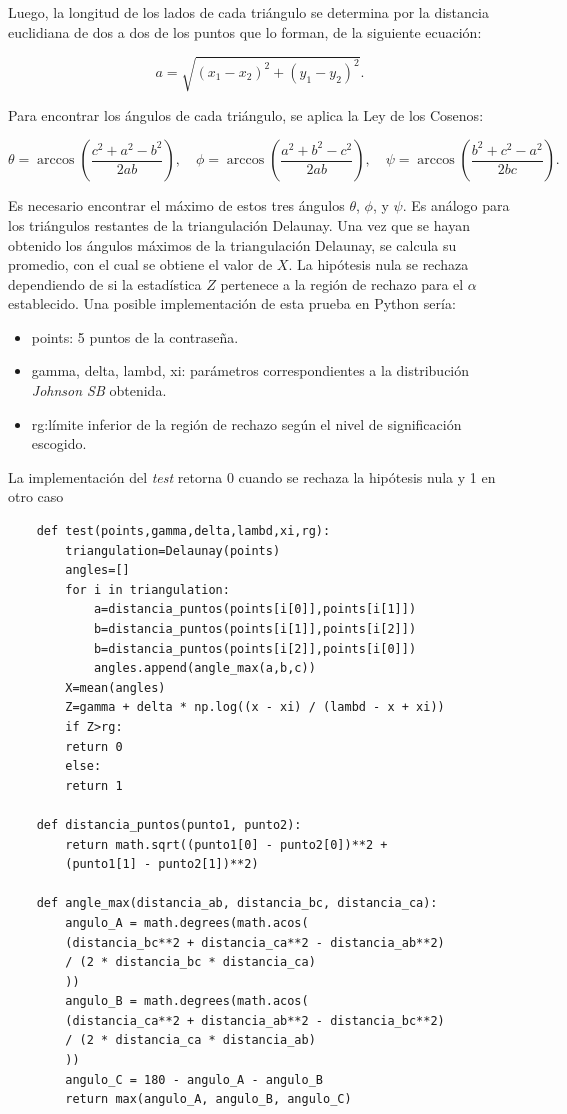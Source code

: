 \documentclass[12pt]{report}
\begin{document}
Luego, la longitud de los lados de cada triángulo se determina por la distancia euclidiana de dos a dos de los puntos que lo forman, de la siguiente ecuación:

\[
a = \sqrt{(x_{1} - x_{2})^2 + (y_{1} - y_{2})^2} .
\]

Para encontrar los ángulos de cada triángulo, se aplica la Ley de los Cosenos:

\[
\theta = \arccos\left(\frac{c^2 + a^2 - b^2}{2ab}\right), \quad \phi = \arccos\left(\frac{a^2 + b^2 - c^2}{2ab}\right), \quad \psi = \arccos\left(\frac{b^2 + c^2 - a^2}{2bc}\right).
\]

Es necesario encontrar el máximo de estos tres ángulos \(\theta\), \(\phi\), y \(\psi\). Es análogo para los triángulos restantes de la triangulación Delaunay. Una vez que se hayan obtenido los ángulos máximos de la triangulación Delaunay, se calcula su promedio, con el cual se obtiene el valor de  \(X\). La hipótesis nula se rechaza dependiendo de si la estadística \(Z\) pertenece a la región de rechazo para el \(\alpha\) establecido. Una posible implementación de esta prueba en Python sería:
\begin{itemize}
	\item points: 5 puntos de la contraseña. 
	\item gamma, delta, lambd, xi: parámetros correspondientes a la distribución \textit{Johnson SB} obtenida.
	\item rg:límite inferior de la región de rechazo según el nivel de significación escogido.
	
\end{itemize}
La implementación del \textit{test} retorna 0 cuando se rechaza la hipótesis nula y 1 en otro caso 



\begin{lstlisting}
	def test(points,gamma,delta,lambd,xi,rg):
		triangulation=Delaunay(points)
		angles=[]
		for i in triangulation:
			a=distancia_puntos(points[i[0]],points[i[1]])
			b=distancia_puntos(points[i[1]],points[i[2]])
			b=distancia_puntos(points[i[2]],points[i[0]])
			angles.append(angle_max(a,b,c))
		X=mean(angles)
		Z=gamma + delta * np.log((x - xi) / (lambd - x + xi))
		if Z>rg:
		return 0
		else:
		return 1
	
	def distancia_puntos(punto1, punto2):
		return math.sqrt((punto1[0] - punto2[0])**2 +
		(punto1[1] - punto2[1])**2)
	
	def angle_max(distancia_ab, distancia_bc, distancia_ca):
		angulo_A = math.degrees(math.acos(
		(distancia_bc**2 + distancia_ca**2 - distancia_ab**2) 
		/ (2 * distancia_bc * distancia_ca)
		))
		angulo_B = math.degrees(math.acos(
		(distancia_ca**2 + distancia_ab**2 - distancia_bc**2) 
		/ (2 * distancia_ca * distancia_ab)
		))
		angulo_C = 180 - angulo_A - angulo_B  
		return max(angulo_A, angulo_B, angulo_C)
\end{lstlisting}
\end{document}
